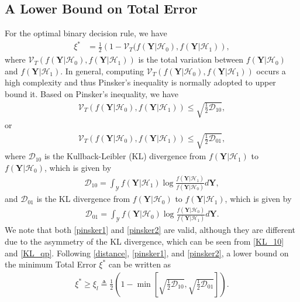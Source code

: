\documentclass[journal]{IEEEtran}
\newcommand{\Hnull}{\mathcal{H}_0}
\newcommand{\Halt}{\mathcal{H}_1}
\begin{document}
\subsection{A Lower Bound on Total Error}

For the optimal binary decision rule, we have \cite{lehmann2005testing,yan2018delay}
\begin{align}\label{distance}
\xi^{\ast} &= \frac{1}{2}\left(1 - \mathcal{V}_T(f(\mathbf{Y}|\Hnull), f(\mathbf{Y}|\Halt)\right),
\end{align}
where $\mathcal{V}_T(f(\mathbf{Y}|\Hnull), f(\mathbf{Y}|\Halt))$ is the total variation between $f(\mathbf{Y}|\Hnull)$ and $f(\mathbf{Y}|\Halt)$. In general, computing $\mathcal{V}_T(f(\mathbf{Y}|\Hnull), f(\mathbf{Y}|\Halt))$ occurs a high complexity and thus Pinsker's inequality is normally adopted to upper bound it. Based on Pinsker's inequality, we have
\begin{align}\label{pinsker1}
\mathcal{V}_T(f(\mathbf{Y}|\Hnull), f(\mathbf{Y}|\Halt)) \!\leq\! \sqrt{\frac{1}{2}\mathcal{D}_{10}},
\end{align}
or
\begin{align}\label{pinsker2}
\mathcal{V}_T(f(\mathbf{Y}|\Hnull), f(\mathbf{Y}|\Halt)) \leq \sqrt{\frac{1}{2}\mathcal{D}_{01}},
\end{align}
where $\mathcal{D}_{10}$ is the Kullback-Leibler (KL) divergence from $f(\mathbf{Y}|\Halt)$ to $f(\mathbf{Y}|\Hnull)$, which is given by
\begin{align}\label{KL_10}
\mathcal{D}_{10} = \int_{\mathcal{Y}} f(\mathbf{Y}|\Halt) \log\frac{f(\mathbf{Y}|\Halt)}{f(\mathbf{Y}|\Hnull)} d \mathbf{Y},
\end{align}
and $\mathcal{D}_{01}$ is the KL divergence from $f(\mathbf{Y}|\Hnull)$ to $f(\mathbf{Y}|\Halt)$, which is given by
\begin{align}\label{KL_qp}
\mathcal{D}_{01} = \int_{\mathcal{Y}} f(\mathbf{Y}|\Hnull) \log\frac{f(\mathbf{Y}|\Hnull)}{f(\mathbf{Y}|\Halt)} d \mathbf{Y}.
\end{align}
We note that both \eqref{pinsker1} and \eqref{pinsker2} are valid, although they are different due to the asymmetry of the KL divergence, which can be seen from \eqref{KL_10} and \eqref{KL_qp}. Following \eqref{distance}, \eqref{pinsker1}, and \eqref{pinsker2}, a lower bound on the minimum Total Error $\xi^{\ast}$ can be written as
\begin{align}\label{KL_te}
\xi^{\ast} \geq \xi_l \triangleq \frac{1}{2}\left(1 - \min\left[\sqrt{\frac{1}{2}\mathcal{D}_{10}}, \sqrt{\frac{1}{2}\mathcal{D}_{01}}\right]\right).
\end{align}
\end{document}
